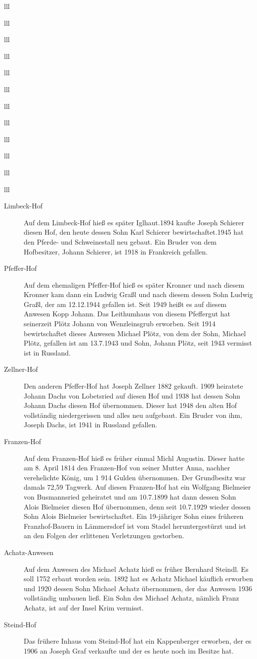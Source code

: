 \documentclass[12pt,a4pager]{book}
\begin{document}
\begin{tabuluar}{lll}
\begin{tabuluar}{lll}
\begin{tabuluar}{lll}
\begin{tabuluar}{lll}
\begin{tabuluar}{lll}
\begin{tabuluar}{lll}
\begin{tabuluar}{lll}
\begin{tabuluar}{lll}
\begin{tabuluar}{lll}
\begin{tabuluar}{lll}
\begin{tabuluar}{lll}
\begin{tabuluar}{lll}
\begin{description}
\item[Limbeck-Hof] Auf dem Limbeck-Hof hieß es später Iglhaut.1894 kaufte
Joseph Schierer diesen Hof, den heute dessen Sohn Karl Schierer
bewirtschaftet.1945 hat den Pferde- und Schweinestall neu gebaut. Ein Bruder von
dem Hofbesitzer, Johann Schierer, ist 1918 in Frankreich gefallen.

\item[Pfeffer-Hof] Auf dem ehemaligen Pfeffer-Hof hieß es später Kronner und
nach diesem Kronner kam dann ein Ludwig Graßl und nach diesem dessen Sohn Ludwig
Graßl, der am 12.12.1944 gefallen ist. Seit 1949 heißt es auf diesem Anwesen
Kopp Johann. Das Leithumhaus von diesem Pfeffergut hat seinerzeit Plötz Johann
von Wenzleinsgrub erworben. Seit 1914 bewirtschaftet dieses Anwesen Michael
Plötz, von dem der Sohn, Michael Plötz, gefallen ist am 13.7.1943 und Sohn,
Johann Plötz, seit 1943 vermisst ist in Russland.

\item[Zellner-Hof] Den anderen Pfeffer-Hof hat Joseph Zellner 1882 gekauft.
1909 heiratete Johann Dachs von Lobetsried auf diesen Hof und 1938 hat dessen
Sohn Johann Dachs diesen Hof übernommen. Dieser hat 1948 den alten Hof
vollständig niedergerissen und alles neu aufgebaut. Ein Bruder von ihm, Joseph
Dachs, ist 1941 in Russland gefallen.

\item[Franzen-Hof] Auf dem Franzen-Hof hieß es früher einmal Michl Augustin.
Dieser hatte am 8. April 1814 den Franzen-Hof von seiner Mutter Anna, nachher
verehelichte König, um 1 914 Gulden übernommen. Der Grundbesitz war damals 72,59
Tagwerk. Auf diesen Franzen-Hof hat ein Wolfgang Bielmeier von Busmannsried
geheiratet und am 10.7.1899 hat dann dessen Sohn Alois Bielmeier diesen Hof
übernommen, denn seit 10.7.1929 wieder dessen Sohn Alois Bielmeier
bewirtschaftet. Ein 19-jähriger Sohn eines früheren Franzhof-Bauern in
Lämmersdorf ist vom Stadel heruntergestürzt und ist an den Folgen der erlittenen
Verletzungen gestorben.

\item[Achatz-Anwesen] Auf dem Anwesen des Michael Achatz hieß es früher
Bernhard Steindl. Es soll 1752 erbaut worden sein. 1892 hat es Achatz Michael
käuflich erworben und 1920 dessen Sohn Michael Achatz übernommen, der das
Anwesen 1936 vollständig umbauen ließ. Ein Sohn des Michael Achatz, nämlich
Franz Achatz, ist auf der Insel Krim vermisst.

\item[Steind-Hof] Das frühere Inhaus vom Steind-Hof hat ein Kappenberger
erworben, der es 1906 an Joseph Graf verkaufte und der es heute noch im Besitze
hat.


\end{description}
\end{tabuluar}
\end{tabuluar}
\end{tabuluar}
\end{tabuluar}
\end{tabuluar}
\end{tabuluar}
\end{tabuluar}
\end{tabuluar}
\end{tabuluar}
\end{tabuluar}
\end{tabuluar}
\end{tabuluar}
\end{document}

